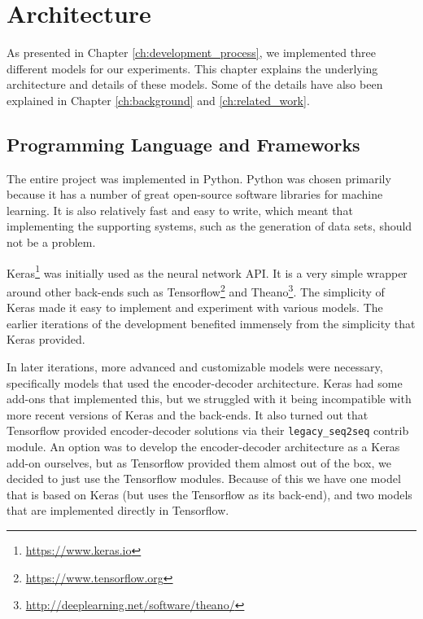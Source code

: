 
\chapter{Architecture}
\label{ch:architecture}
As presented in Chapter \ref{ch:development_process}, we implemented three different models for our experiments. This chapter explains the underlying architecture and details of these models. Some of the details have also been explained in Chapter \ref{ch:background} and \ref{ch:related_work}.


\section{Programming Language and Frameworks}
The entire project was implemented in Python. Python was chosen primarily because it has a number of great open-source software libraries for machine learning. It is also relatively fast and easy to write, which meant that implementing the supporting systems, such as the generation of data sets, should not be a problem.

Keras\footnote{\url{https://www.keras.io}} was initially used as the neural network API. It is a very simple wrapper around other back-ends such as Tensorflow\footnote{\url{https://www.tensorflow.org}} and Theano\footnote{\url{http://deeplearning.net/software/theano/}}. The simplicity of Keras made it easy to implement and experiment with various models. The earlier iterations of the development benefited immensely from the simplicity that Keras provided.

In later iterations, more advanced and customizable models were necessary, specifically models that used the encoder-decoder architecture. Keras had some add-ons that implemented this, but we struggled with it being incompatible with more recent versions of Keras and the back-ends. It also turned out that Tensorflow provided encoder-decoder solutions via their {\tt legacy\_seq2seq} contrib module. An option was to develop the encoder-decoder architecture as a Keras add-on ourselves, but as Tensorflow provided them almost out of the box, we decided to just use the Tensorflow modules. Because of this we have one model that is based on Keras (but uses the Tensorflow as its back-end), and two models that are implemented directly in Tensorflow.



